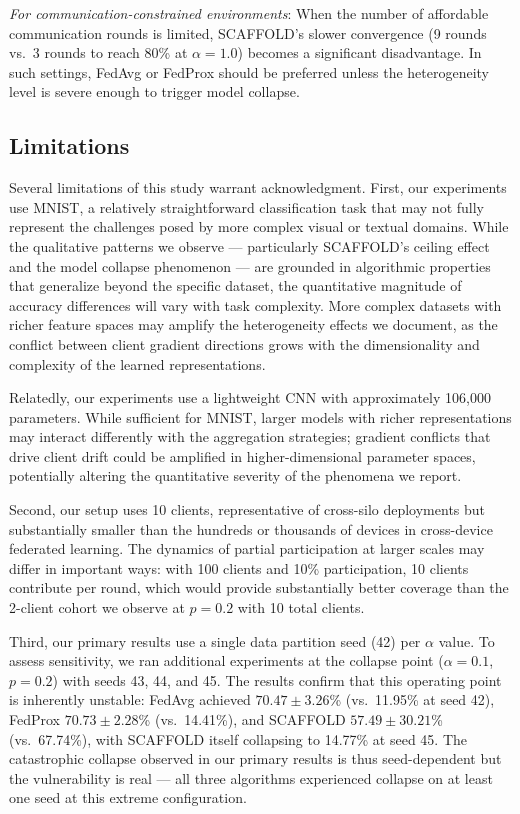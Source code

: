 \documentclass[conference]{IEEEtran}
\begin{document}
\textit{For communication-constrained environments}: When the number of affordable communication rounds is limited, SCAFFOLD's slower convergence (9 rounds vs.\ 3 rounds to reach 80\% at $\alpha = 1.0$) becomes a significant disadvantage. In such settings, FedAvg or FedProx should be preferred unless the heterogeneity level is severe enough to trigger model collapse.

\subsection{Limitations}
\label{sec:limitations}

Several limitations of this study warrant acknowledgment. First, our experiments use MNIST, a relatively straightforward classification task that may not fully represent the challenges posed by more complex visual or textual domains. While the qualitative patterns we observe --- particularly SCAFFOLD's ceiling effect and the model collapse phenomenon --- are grounded in algorithmic properties that generalize beyond the specific dataset, the quantitative magnitude of accuracy differences will vary with task complexity. More complex datasets with richer feature spaces may amplify the heterogeneity effects we document, as the conflict between client gradient directions grows with the dimensionality and complexity of the learned representations.

Relatedly, our experiments use a lightweight CNN with approximately 106,000 parameters. While sufficient for MNIST, larger models with richer representations may interact differently with the aggregation strategies; gradient conflicts that drive client drift could be amplified in higher-dimensional parameter spaces, potentially altering the quantitative severity of the phenomena we report.

Second, our setup uses 10 clients, representative of cross-silo deployments but substantially smaller than the hundreds or thousands of devices in cross-device federated learning. The dynamics of partial participation at larger scales may differ in important ways: with 100 clients and 10\% participation, 10 clients contribute per round, which would provide substantially better coverage than the 2-client cohort we observe at $p = 0.2$ with 10 total clients.

Third, our primary results use a single data partition seed (42) per $\alpha$ value. To assess sensitivity, we ran additional experiments at the collapse point ($\alpha = 0.1$, $p = 0.2$) with seeds 43, 44, and 45. The results confirm that this operating point is inherently unstable: FedAvg achieved $70.47 \pm 3.26$\% (vs.\ 11.95\% at seed 42), FedProx $70.73 \pm 2.28$\% (vs.\ 14.41\%), and SCAFFOLD $57.49 \pm 30.21$\% (vs.\ 67.74\%), with SCAFFOLD itself collapsing to 14.77\% at seed 45. The catastrophic collapse observed in our primary results is thus seed-dependent but the vulnerability is real --- all three algorithms experienced collapse on at least one seed at this extreme configuration.
\end{document}
